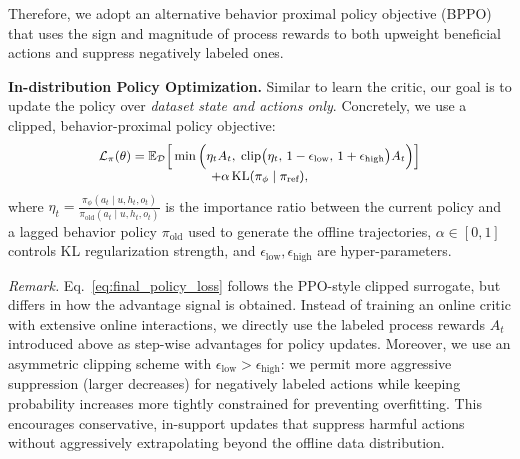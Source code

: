 \documentclass{article}
\theoremstyle{plain}
\theoremstyle{definition}
\theoremstyle{remark}
\begin{document}
Therefore, we adopt an alternative behavior proximal policy objective (BPPO) that uses the sign and magnitude of process rewards to both upweight beneficial actions and suppress negatively labeled ones.


\textbf{In-distribution Policy Optimization.}
\label{sec:policy} 
Similar to learn the critic, our goal is to update the policy over \emph{dataset state and actions only}. Concretely, we use a clipped, behavior-proximal policy objective:
\begin{equation}
\small
\begin{array}{cc}
\mathcal{L}_{\pi}(\theta)
=
\mathbb{E}_{\mathcal D}
\Big[
\min\Big(
\eta_tA_t,\;
\mathrm{clip}\big(\eta_t,\,1-\epsilon_{\text{low}},\,1+\epsilon_{\text{high}}\big)A_t
\Big)
\Big] \\
+\alpha\,\mathrm{KL}(\pi_\phi \mid \pi_{\text{ref}}),
\end{array}
\label{eq:final_policy_loss}
\end{equation}
where $\eta_t=\frac{\pi_\phi(a_t\mid u, h_t, o_t)}{\pi_{\text{old}}(a_t\mid u, h_t, o_t)}$ is the importance ratio between the current policy and a lagged behavior policy $\pi_{\text{old}}$ used to generate the offline trajectories, $\alpha\in[0,1]$ controls KL regularization strength, and $\epsilon_{\text{low}},\epsilon_{\text{high}}$ are hyper-parameters. 

\emph{Remark.} Eq.~\ref{eq:final_policy_loss} follows the PPO-style clipped surrogate, but differs in how the advantage signal is obtained. Instead of training an online critic with extensive online interactions, we directly use the labeled process rewards $A_t$ introduced above as step-wise advantages for policy updates. Moreover, we use an asymmetric clipping scheme with $\epsilon_{\text{low}}>\epsilon_{\text{high}}$: we permit more aggressive suppression (larger decreases) for negatively labeled actions while keeping probability increases more tightly constrained for preventing overfitting. This encourages conservative, in-support updates that suppress harmful actions without aggressively extrapolating beyond the offline data distribution.
\end{document}
